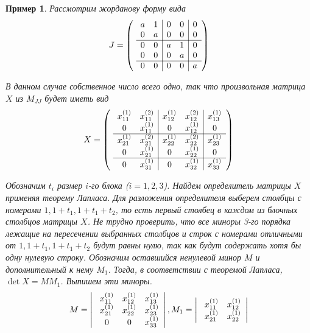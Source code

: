 \documentclass[11pt, a4paper]{article}
\newtheorem{example}{Пример}
\begin{document}
\begin{example}
    Рассмотрим жорданову форму вида
    $$J =
    \left(\
        \begin{array}{c c | c c | c}
            a & 1 & 0 & 0 & 0 \\
            0 & a & 0 & 0 & 0 \\
            \hline
            0 & 0 & a & 1 & 0 \\
            0 & 0 & 0 & a & 0 \\
            \hline
            0 & 0 & 0 & 0 & a \\
        \end{array}
    \right)
    $$

    В данном случае собственное число всего одно, так что произвольная матрица $X$ из $M_{JJ}$ будет иметь вид
        $$X =
    \left(\
        \begin{array}{c c | c c | c}
            x_{11}^{(1)} & x_{11}^{(2)} & x_{12}^{(1)} & x_{12}^{(2)} & x_{13}^{(1)} \\
            0 & x_{11}^{(1)} & 0 & x_{12}^{(1)} & 0 \\
            \hline
            x_{21}^{(1)} & x_{21}^{(2)} & x_{22}^{(1)} & x_{22}^{(2)} & x_{23}^{(1)} \\
            0 & x_{21}^{(1)} & 0 & x_{22}^{(1)} & 0 \\
            \hline
            0 & x_{31}^{(1)} & 0 & x_{32}^{(1)} & x_{33}^{(1)} \\
        \end{array}
    \right)
    $$

    Обозначим $t_i$ размер $i$-го блока ($i=1,2,3$). Найдем определитель матрицы $X$ применяя теорему Лапласа. Для разложения определителя выберем столбцы с номерами
    $1, 1 + t_1, 1 + t_1 + t_2$, то есть первый столбец в каждом из блочных столбцов матрицы $X$. Не трудно проверить, что все миноры 3-го порядка лежащие на пересечении выбранных
    столбцов и строк с номерами отличными от $1, 1 + t_1, 1 + t_1 + t_2$  будут равны нулю, так как будут содержать хотя бы одну нулевую строку. Обозначим оставшийся ненулевой 
    минор $M$ и дополнительный к нему $M_1$. Тогда, в соответствии с теоремой Лапласа, $\det X = MM_1$. Выпишем эти миноры.
    $$M =
    \left|\
        \begin{array}{c c c}
            x_{11}^{(1)} & x_{12}^{(1)} & x_{13}^{(1)} \\
            x_{21}^{(1)} & x_{22}^{(1)} & x_{23}^{(1)} \\
            0 & 0 & x_{33}^{(1)} \\
        \end{array}
    \right|,
    M_1 =
    \left|\
        \begin{array}{c c}
            x_{11}^{(1)} & x_{12}^{(1)}  \\
            x_{21}^{(1)} & x_{22}^{(1)}  \\
        \end{array}
    \right|
    $$


\end{example}
\end{document}
